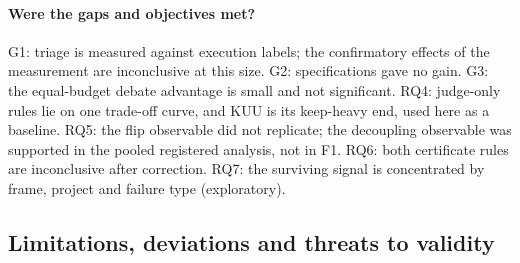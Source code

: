 \documentclass[pdflatex,iicol,sn-mathphys-num]{sn-jnl}
\begin{document}
\paragraph{Were the gaps and objectives met?} G1: triage is measured against execution labels; the confirmatory effects of the measurement are inconclusive at this size. G2: specifications gave no gain. G3: the equal-budget debate advantage is small and not significant. RQ4: judge-only rules lie on one trade-off curve, and KUU is its keep-heavy end, used here as a baseline. RQ5: the flip observable did not replicate; the decoupling observable was supported in the pooled registered analysis, not in F1. RQ6: both certificate rules are inconclusive after correction. RQ7: the surviving signal is concentrated by frame, project and failure type (exploratory).

\subsection{Limitations, deviations and threats to validity}
\end{document}
